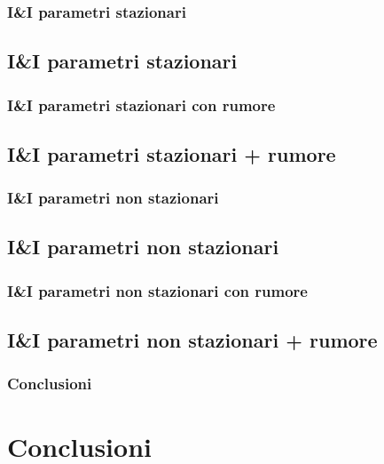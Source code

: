 \documentclass{beamer}
\begin{document}
\begin{frame}
	\frametitle{I\&I parametri stazionari}
	\subsection{I\&I parametri stazionari}

\end{frame}
\begin{frame}
	\frametitle{I\&I parametri stazionari con rumore}
	\subsection{I\&I parametri stazionari + rumore}

\end{frame}
\begin{frame}
	\frametitle{I\&I parametri non stazionari}
	\subsection{I\&I parametri non stazionari}

\end{frame}
\begin{frame}
	\frametitle{I\&I parametri non stazionari con rumore}
	\subsection{I\&I parametri non stazionari + rumore}

\end{frame}
\begin{frame}
	\frametitle{Conclusioni}
	\section{Conclusioni}

\end{frame}
\end{document}
